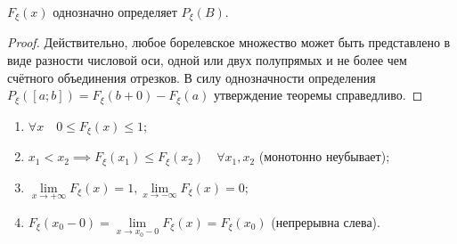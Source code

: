 \begin{thm*}
    $F_\xi(x)$ однозначно определяет $P_\xi(B)$.
\end{thm*}
\begin{proof}
    Действительно, любое борелевское множество может быть представлено в виде разности числовой оси, одной или двух полупрямых и не более чем счётного объединения отрезков. 
    В силу однозначности определения $P_\xi([a;b]) = F_\xi(b + 0) - F_\xi(a)$ утверждение теоремы справедливо.
\end{proof}

\begin{namedthm}\leavevmode
\begin{enumerate}
    \item $\forall x \quad 0 \leqslant F_\xi(x) \leqslant 1$;
    \item $x_1 < x_2 \implies F_\xi(x_1) \leqslant F_\xi(x_2) \quad \forall x_1, x_2$ (монотонно неубывает);
    \item $\lim\limits_{x \to +\infty} F_\xi(x) = 1, \lim\limits_{x \to -\infty} F_\xi(x) = 0$;
    \item $F_\xi(x_0 - 0) = \lim\limits_{x \to x_0 - 0}F_\xi(x) = F_\xi(x_0)$ (непрерывна слева).
\end{enumerate}
\end{namedthm}

